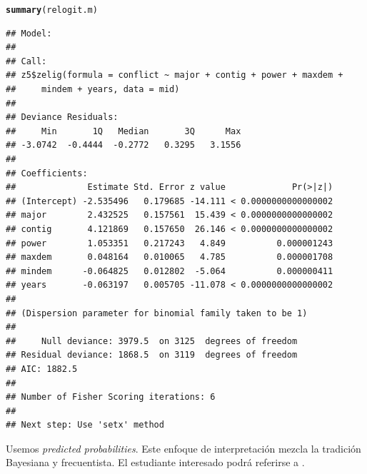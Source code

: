 \documentclass[onesided]{article}\usepackage[]{graphicx}\usepackage[]{color}
\makeatletter
\newcommand{\hlstd}[1]{\textcolor[rgb]{0.345,0.345,0.345}{#1}}%
\newcommand{\hlkwd}[1]{\textcolor[rgb]{0.737,0.353,0.396}{\textbf{#1}}}%
\newenvironment{kframe}{%
 \def\at@end@of@kframe{}%
 \ifinner\ifhmode%
  \def\at@end@of@kframe{\end{minipage}}%
  \begin{minipage}{\columnwidth}%
 \fi\fi%
 \def\FrameCommand##1{\hskip\@totalleftmargin \hskip-\fboxsep
 \colorbox{shadecolor}{##1}\hskip-\fboxsep
     \hskip-\linewidth \hskip-\@totalleftmargin \hskip\columnwidth}%
 \MakeFramed {\advance\hsize-\width
   \@totalleftmargin\z@ \linewidth\hsize
   \@setminipage}}%
 {\par\unskip\endMakeFramed%
 \at@end@of@kframe}
\newenvironment{knitrout}{}{} %
\makeatother
\begin{document}
\begin{knitrout}
\color{fgcolor}\begin{kframe}
\begin{alltt}
\hlkwd{summary}\hlstd{(relogit.m)}
\end{alltt}
\begin{verbatim}
## Model: 
## 
## Call:
## z5$zelig(formula = conflict ~ major + contig + power + maxdem + 
##     mindem + years, data = mid)
## 
## Deviance Residuals: 
##     Min       1Q   Median       3Q      Max  
## -3.0742  -0.4444  -0.2772   0.3295   3.1556  
## 
## Coefficients:
##              Estimate Std. Error z value             Pr(>|z|)
## (Intercept) -2.535496   0.179685 -14.111 < 0.0000000000000002
## major        2.432525   0.157561  15.439 < 0.0000000000000002
## contig       4.121869   0.157650  26.146 < 0.0000000000000002
## power        1.053351   0.217243   4.849          0.000001243
## maxdem       0.048164   0.010065   4.785          0.000001708
## mindem      -0.064825   0.012802  -5.064          0.000000411
## years       -0.063197   0.005705 -11.078 < 0.0000000000000002
## 
## (Dispersion parameter for binomial family taken to be 1)
## 
##     Null deviance: 3979.5  on 3125  degrees of freedom
## Residual deviance: 1868.5  on 3119  degrees of freedom
## AIC: 1882.5
## 
## Number of Fisher Scoring iterations: 6
## 
## Next step: Use 'setx' method
\end{verbatim}
\end{kframe}
\end{knitrout}


Usemos \emph{predicted probabilities}. Este enfoque de interpretaci\'on mezcla la tradici\'on Bayesiana y frecuentista. El estudiante interesado podr\'a referirse a \textcite{King2000}.
\end{document}
